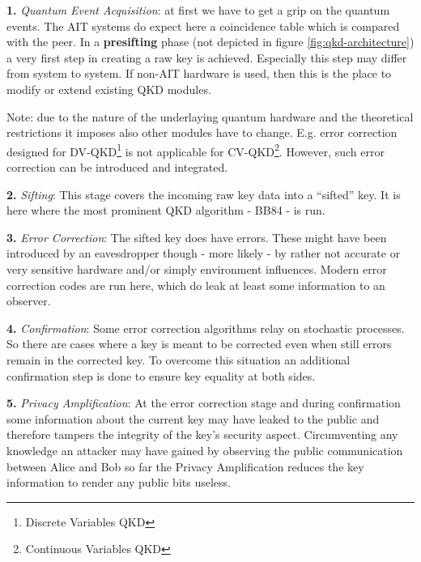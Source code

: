 \medskip

\textbf{1.} \emph{Quantum Event Acquisition}: at first we have to get a grip on the quantum events. The AIT systems do expect here a coincidence table which is compared with the peer. In a \textbf{presifting} phase (not depicted in figure \ref{fig:qkd-architecture}) a very first step in creating a raw key is achieved. Especially this step may differ from system to system. If non-AIT hardware is used, then this is the place to modify or extend existing QKD modules.

\medskip

Note: due to the nature of the underlaying quantum hardware and the theoretical restrictions it imposes also other modules have to change. E.g. error correction designed for DV-QKD\footnote{Discrete Variables QKD} is not applicable for CV-QKD\footnote{Continuous Variables QKD}. However, such error correction can be introduced and integrated.

\medskip

\textbf{2.} \emph{Sifting}: This stage covers the incoming raw key data into a ``sifted'' key. It is here where the most prominent QKD algorithm - BB84 - is run.

\medskip

\textbf{3.} \emph{Error Correction}: The sifted key does have errors. These might have been introduced by an eavesdropper though - more likely - by rather not accurate or very sensitive hardware and/or simply environment influences. Modern error correction codes are run here, which do leak at least some information to an observer.

\medskip

\textbf{4.} \emph{Confirmation}: Some error correction algorithms relay on stochastic processes. So there are cases where a key is meant to be corrected even when still errors remain in the corrected key. To overcome this situation an additional confirmation step is done to ensure key equality at both sides.

\medskip

\textbf{5.} \emph{Privacy Amplification}: At the error correction stage and during confirmation some information about the current key may have leaked to the public and therefore tampers the integrity of the key's security aspect. Circumventing any knowledge an attacker may have gained by observing the public communication between Alice and Bob so far the Privacy Amplification reduces the key information to render any public bits useless.


